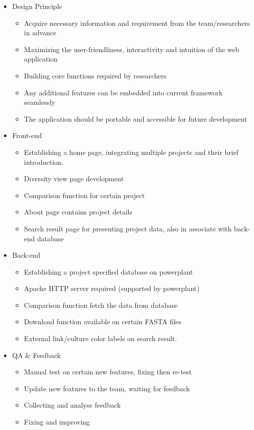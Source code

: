 \documentclass{scrreprt}
\begin{document}
\begin{itemize}
  \item Design Principle
    \begin{itemize}
        \item Acquire necessary information and requirement from the team/researchers in advance
        \item Maximizing the user-friendliness, interactivity and intuition of the web application 
        \item Building core functions required by researchers
        \item Any additional features can be embedded into current framework seamlessly
        \item The application should be portable and accessible for future development  
    \end{itemize}
  \item Front-end 
    \begin{itemize}
        \item Establishing a home page, integrating multiple projects and their brief introduction.
        \item Diversity view page development 
        \item Comparison function for certain project
        \item About page contains project details
        \item Search result page for presenting project data, also in associate with back-end database
    \end{itemize}
  \item Back-end
  \begin{itemize}
        \item Establishing a project specified database on powerplant
        \item Apache HTTP server required (supported by powerplant) 
        \item Comparison function fetch the data from database
        \item Download function available on certain FASTA files
        \item External link/culture color labels on search result. 
    \end{itemize}
  \item QA \& Feedback
  \begin{itemize}
        \item Manual test on certain new features, fixing then re-test  
        \item Update new features to the team, waiting for feedback
        \item Collecting and analyse feedback 
        \item Fixing and improving
    \end{itemize}
\end{itemize}
 
\end{document}
